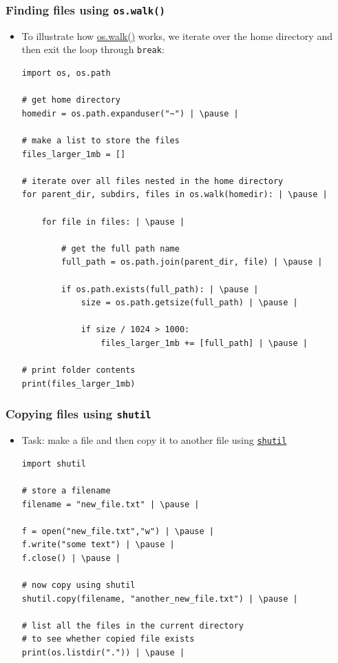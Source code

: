 \documentclass[xcolor=table]{beamer}
\begin{document}
\begin{frame}[fragile]
    \frametitle{Finding files using \texttt{os.walk()}}
    \begin{itemize}
        \item To illustrate how \href{https://docs.python.org/3.7/library/os.html#os.walk}{os.walk()} works, we iterate over the home directory and then exit the loop through \texttt{break}:
\begin{lstlisting}[style=pythonsmall]
import os, os.path

# get home directory
homedir = os.path.expanduser("~") | \pause |

# make a list to store the files
files_larger_1mb = []

# iterate over all files nested in the home directory
for parent_dir, subdirs, files in os.walk(homedir): | \pause |

    for file in files: | \pause |

        # get the full path name
        full_path = os.path.join(parent_dir, file) | \pause |

        if os.path.exists(full_path): | \pause |
            size = os.path.getsize(full_path) | \pause |

            if size / 1024 > 1000:
                files_larger_1mb += [full_path] | \pause |

# print folder contents
print(files_larger_1mb)
\end{lstlisting}
    \end{itemize}
\end{frame}

\begin{frame}[fragile]
    \frametitle{Copying files using \texttt{shutil}}
\begin{itemize}
    \item Task: make a file and then copy it to another file using \href{https://docs.python.org/3/library/shutil.html}{\texttt{shutil}}
\begin{lstlisting}[style=python]
import shutil 

# store a filename 
filename = "new_file.txt" | \pause |

f = open("new_file.txt","w") | \pause |
f.write("some text") | \pause |
f.close() | \pause |

# now copy using shutil
shutil.copy(filename, "another_new_file.txt") | \pause |

# list all the files in the current directory
# to see whether copied file exists
print(os.listdir(".")) | \pause |

\end{lstlisting}
\end{itemize}
\end{frame}




\end{document}
